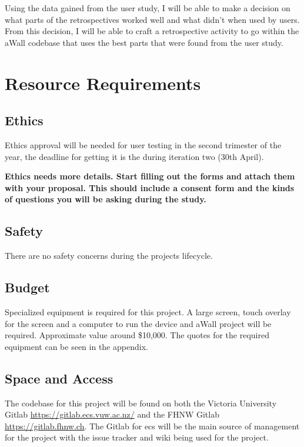 \documentclass[11pt, a4paper, twoside, openright]{report}
\begin{document}
Using the data gained from the user study, I will be able to make a decision on what parts of the retrospectives worked well and what didn't when used by users. From this decision, I will be able to craft a retrospective activity to go within the aWall codebase that uses the best parts that were found from the user study. 

\section*{Resource Requirements}

\subsection*{Ethics} \label{ethics}

Ethics approval will be needed for user testing in the second trimester of the year, the deadline for getting it is the during iteration two (30th April). 

\textbf{Ethics needs more details. Start filling out the forms and attach them with your proposal. This should include a consent form and the kinds of questions you will be asking during the study.}

\subsection*{Safety}

There are no safety concerns during the projects lifecycle.

\subsection*{Budget}

Specialized equipment is required for this project. A large screen, touch overlay for the screen and a computer to run the device and aWall project will be required. Approximate value around \$10,000. The quotes for the required equipment can be seen in the appendix.

\subsection*{Space and Access}

The codebase for this project will be found on both the Victoria University Gitlab \url{https://gitlab.ecs.vuw.ac.nz/} and the FHNW Gitlab \url{https://gitlab.fhnw.ch}. The Gitlab for ecs will be the main source of management for the project with the issue tracker and wiki being used for the project.
\end{document}
